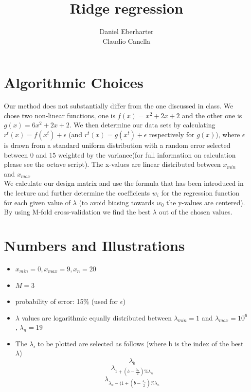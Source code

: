 \documentclass[12pt]{article}
\author{Daniel Eberharter\\ Claudio Canella}
\title{Ridge regression}
\begin{document}
\maketitle


\section{Algorithmic Choices}
Our method does not substantially differ from the one discussed in class. We chose two non-linear functions, one is $f(x) = x^2 + 2x + 2$ and the other one is $g(x) = 6x^2 + 2x + 2$. We then determine our data sets by calculating $r^t(x) = f(x^t) + \epsilon$ (and $r^t(x) = g(x^t) + \epsilon$ respectively for $g(x)$), where $\epsilon$ is drawn from a standard uniform distribution with a random error selected between 0 and 15 weighted by the variance(for full information on calculation please see the octave script). The x-values are linear distributed between $x_{min}$ and $x_{max}$ \\
We calculate our design matrix and use the formula that has been introduced in the lecture and further determine the coefficients $w_i$ for the regression function  for each given value of $\lambda$ (to avoid biasing towards $w_0$ the y-values are centered). \\
By using M-fold cross-validation we find the best $\lambda$ out of the chosen values.
\pagebreak

\section{Numbers and Illustrations}
	\begin{itemize} \label{plotted}
		\item $x_{min} = 0, x_{max} = 9, x_n = 20$
		\item $M = 3$
		\item probability of error: 15\% (used for $\epsilon$)
		\item $\lambda$ values are logarithmic equally distributed between $\lambda_{min} = 1$ and $\lambda_{max} = 10^6$, $\lambda_n = 19$
		\item The $\lambda_i$ to be plotted are selected as follows (where b is the index of the best $\lambda$)
			\[ \lambda_{b} \]
			\[ \lambda_{1+(b - \frac{\lambda_n}{2}) \% \lambda_n} \]
			\[ \lambda_{\lambda_n -( 1+(b - \frac{\lambda_n}{2}) \% \lambda_n}\]
	\end{itemize}
\end{document}
